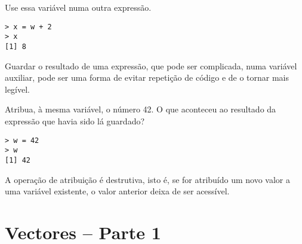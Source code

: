 \documentclass{exam}
\begin{document}
\begin{questions}
\question Use essa variável numa outra expressão.
\begin{solution}
\begin{verbatim}
> x = w + 2
> x
[1] 8
\end{verbatim}
Guardar o resultado de uma expressão, que pode ser complicada, numa variável auxiliar, pode ser uma forma de evitar repetição de código e de o tornar mais legível.
\end{solution}

\question Atribua, à mesma variável, o número 42. O que aconteceu ao resultado da expressão que havia sido lá guardado?
\begin{solution}
\begin{verbatim}
> w = 42
> w
[1] 42
\end{verbatim}
A operação de atribuição é destrutiva, isto é, se for atribuído um novo valor a uma variável existente, o valor anterior deixa de ser acessível. 
\end{solution}
\end{questions}

\section{Vectores -- Parte 1}
\end{document}
